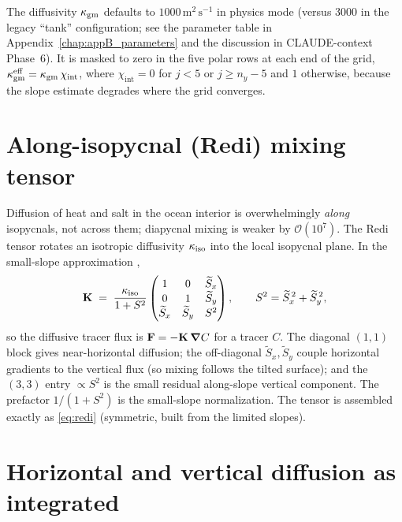 The diffusivity $\kappa_{\mathrm{gm}}$ defaults to $1000\,\mathrm{m^2\,s^{-1}}$ in physics mode
(versus $3000$ in the legacy ``tank'' configuration; see the parameter table in
Appendix~\ref{chap:appB_parameters} and the discussion in CLAUDE-context Phase~6).
It is masked to zero in the five polar rows at each end of the grid,
$\kappa_{\mathrm{gm}}^{\mathrm{eff}} = \kappa_{\mathrm{gm}}\,\chi_{\mathrm{int}}$, where $\chi_{\mathrm{int}}=0$ for
$j<5$ or $j\ge n_y-5$ and $1$ otherwise, because the slope estimate degrades where
the grid converges.

\section{Along-isopycnal (Redi) mixing tensor}

Diffusion of heat and salt in the ocean interior is overwhelmingly \emph{along}
isopycnals, not across them; diapycnal mixing is weaker by $\mathcal{O}(10^7)$.
The Redi tensor \citep{redi1982} rotates an isotropic diffusivity $\kappa_{\mathrm{iso}}$ into the local isopycnal
plane. In the small-slope approximation \citep{griffies2004},
\begin{equation}
\mathbf{K} \;=\; \frac{\kappa_{\mathrm{iso}}}{1+S^2}
\begin{pmatrix}
1 & 0 & \widetilde S_x\\
0 & 1 & \widetilde S_y\\
\widetilde S_x & \widetilde S_y & S^2
\end{pmatrix},
\qquad S^2 = \widetilde S_x^{\,2} + \widetilde S_y^{\,2},
\label{eq:redi}
\end{equation}
so the diffusive tracer flux is $\mathbf{F} = -\mathbf{K}\,\boldsymbol{\nabla} C$ for a tracer $C$.
The diagonal $(1,1)$ block gives near-horizontal diffusion; the off-diagonal
$\widetilde S_x,\widetilde S_y$ couple horizontal gradients to the vertical flux (so
mixing follows the tilted surface); and the $(3,3)$ entry $\propto S^2$ is the small
residual along-slope vertical component. The prefactor $1/(1+S^2)$ is the small-slope
normalization. The tensor is assembled exactly as \eqref{eq:redi} (symmetric,
built from the limited slopes).

\section{Horizontal and vertical diffusion as integrated}\label{sec:hdiff}

